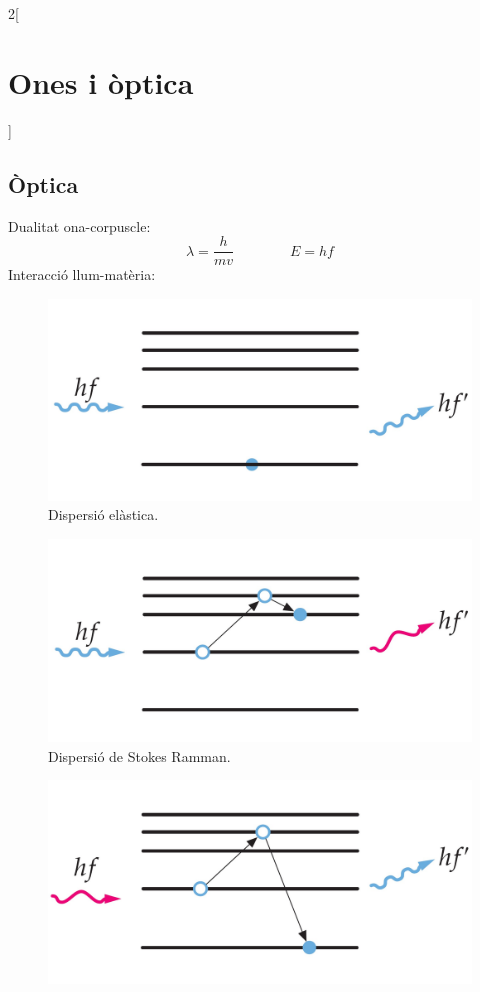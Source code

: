 \documentclass[class=article,10pt,crop=false]{standalone}
\begin{document}
\begin{multicols}{2}[\section{Ones i òptica}]
\subsection{Òptica}
Dualitat ona-corpuscle:$$\lambda=\frac{h}{mv}\qquad\qquad E=hf$$
Interacció llum-matèria:\newline
\begin{figure}[ht]
    \includegraphics[width=\linewidth]{Physics/1st/Ones_i_optica/Imatges/elasticscatt.jpg}
    \caption{Dispersió e\-làs\-ti\-ca.}
\end{figure}
\begin{figure}[ht]
    \includegraphics[width=\linewidth]{Physics/1st/Ones_i_optica/Imatges/StokesRamman.jpg} 
    \caption{Dispersió de Stokes Ramman.}   
\end{figure}
\begin{figure}[ht]
    \includegraphics[width=\linewidth]{Physics/1st/Ones_i_optica/Imatges/AStokesRamman.jpg}

\end{figure}
\end{multicols}
\end{document}
